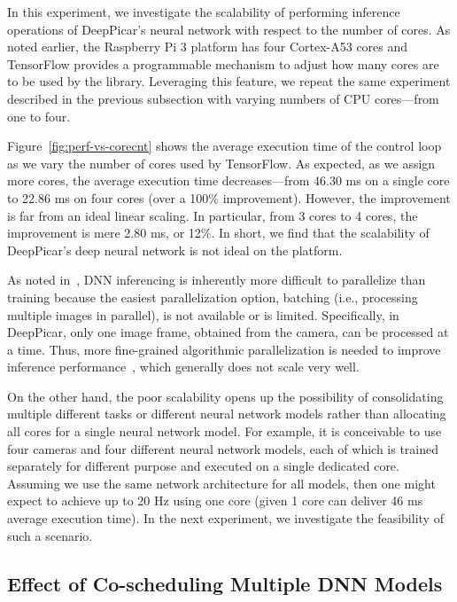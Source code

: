 In this experiment, we investigate the scalability of performing
inference operations of DeepPicar's neural network with respect to the
number of cores. As noted earlier, the Raspberry Pi 3 platform has
four Cortex-A53 cores and TensorFlow 
provides a programmable mechanism to adjust how many cores are to be
used by the library. Leveraging this feature, we repeat the
same experiment described in the previous subsection with varying
numbers of CPU cores---from one to four.

Figure~\ref{fig:perf-vs-corecnt} shows the average execution time of
the control loop as we vary the number of cores used by
TensorFlow. As expected, as we assign more cores, the average execution
time decreases---from 46.30 ms on a single core to 22.86 ms on four
cores (over a 100\% improvement). However, the improvement is far from an ideal
linear scaling. In particular, from 3 cores to 4 cores, the
improvement is mere 2.80 ms, or 12\%. In short, we find that the
scalability of DeepPicar's deep neural network is not ideal on the
platform.

As noted in~\cite{NVIDIA2015}, DNN inferencing is inherently more
difficult to parallelize than training because the easiest
parallelization option, batching (i.e., processing multiple images in
parallel), is not available or is limited. Specifically, in DeepPicar,
only one image frame, obtained from the camera, can be processed at a
time. Thus, more fine-grained algorithmic parallelization is needed to
improve inference performance~\cite{NVIDIA2015}, which generally does
not scale very well. 

On the other hand, the poor scalability opens up the possibility of
consolidating multiple different tasks or different neural network
models rather than allocating all cores for a single neural network
model.
For example, it is conceivable to use four cameras and four different
neural network models, each of which is trained separately for
different purpose and executed on a single dedicated core.
Assuming we use the same network
architecture for all models, then one might expect to achieve up to
20 Hz using one core (given 1 core can deliver 46 ms average
execution time).
In the next experiment, we investigate the
feasibility of such a scenario.

\subsection{Effect of Co-scheduling Multiple DNN Models}

